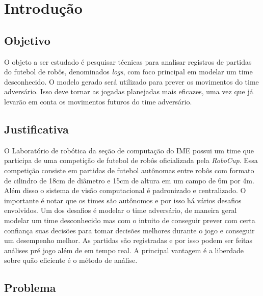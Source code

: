 \chapter{Introdução}


\section{Objetivo}


\par O objeto a ser estudado é pesquisar técnicas para analisar registros de partidas do futebol de robôs,
denominados \textit{logs}, com foco principal em modelar um time desconhecido. O modelo
gerado será utilizado para prever os movimentos do time adversário. Isso deve tornar
as jogadas planejadas mais  eficazes, uma vez que já levarão em conta os movimentos
futuros do time adversário.

\section{Justificativa}

\par O Laboratório de robótica da seção de computação do IME possui um time que
participa de uma competição de futebol de robôs oficializada pela \textit{RoboCup}.
Essa competição consiste em partidas de futebol autônomas entre robôs com formato
de cilindro de 18cm de diâmetro e 15cm de altura em um campo de 6m por 4m. Além disso
o sistema de visão computacional é padronizado e centralizado. O importante é notar
que os times são autônomos e por isso há vários desafios envolvidos.
Um dos desafios é modelar o time adversário, de maneira geral modelar um time desconhecido
mas com o intuito de conseguir prever com certa confiança suas decisões para tomar
decisões melhores durante o jogo e conseguir um desempenho melhor.
As partidas são registradas e por isso podem ser feitas análises pré jogo além
de em tempo real. A principal vantagem é a liberdade sobre quão eficiente é o método
de análise.

\section{Problema}


